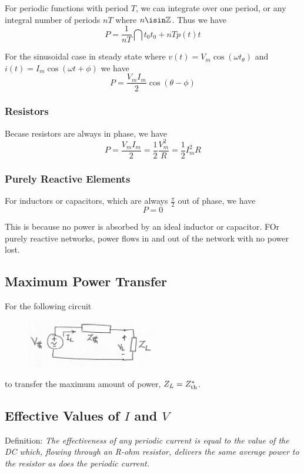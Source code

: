 \documentclass[12pt]{article}
\begin{document}
For periodic functions with period $T$, we can integrate over one period, or any integral number of periods $nT$ where $n \isin \mathbb{Z}$. Thus we have \[ P = \frac{1}{nT} \dint{t_0}{t_0+nT}{p(t)}{t} \]

For the sinusoidal case in steady state where $v(t) = V_m\cos(\omega t _ \theta)$ and $i(t) = I_m\cos(\omega t + \phi)$ we have \[ P = \frac{V_mI_m}{2}\cos(\theta - \phi) \]

\subsubsection*{Resistors}
Becase resistors are always in phase, we have \[ P = \frac{V_mI_m}{2} = \frac{1}{2}\frac{V_m^2}{R} = \frac{1}{2}I_m^2R \]

\subsubsection*{Purely Reactive Elements}
For inductors or capacitors, which are always $\frac{\pi}{2}$ out of phase, we have \[ P = 0 \]

This is because no power is absorbed by an ideal inductor or capacitor. FOr purely reactive networks, power flows in and out of the network with no power lost.

\newpage
\subsection*{Maximum Power Transfer}
For the following circuit
\begin{figure}[ht]
\centering
\includegraphics[width=0.5\textwidth]{impedance.png}
\end{figure}

to transfer the maximum amount of power, $Z_L = Z_{{\rm th}}^*$. 

\subsection*{Effective Values of $I$ and $V$}
Definition: \textit{The effectiveness of any periodic current is equal to the value of the DC which, flowing through an R-ohm resistor, delivers the same average power to the resistor as does the periodic current.}
\end{document}
